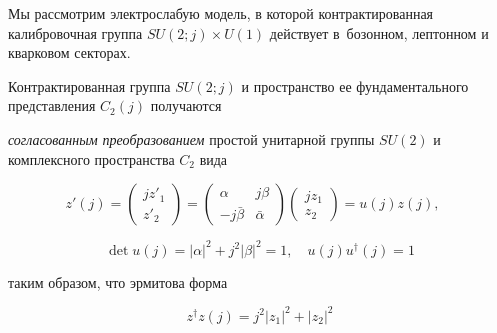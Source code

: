 
Мы рассмотрим электрослабую модель, в которой контрактированная калибровочная группа \mbox{$S\!U\!(\!2;\!j\!){\times} U\!(\!1\!)$} действует в~бозонном, лептонном и кварковом секторах. 

Контрактированная группа $SU(2;j)$ и пространство ее фундаментального представления $C_2(j)$ получаются 

\cite{gromov:Gr-2010, gromov:Gr-2011}

{\em согласованным преобразованием} простой унитарной группы $SU(2)$ и комплексного пространства $C_2$ вида

$$

z'(j)=

\left(\begin{array}{c}

jz'_1 \\

z'_2

\end{array} \right)

=\left(\begin{array}{cc}

	\alpha & j\beta   \\

-j\bar{\beta}	 & \bar{\alpha}

\end{array} \right)

\left(\begin{array}{c}

jz_1 \\

z_2

\end{array} \right)

=u(j)z(j), \quad

$$

\begin{equation}

\det u(j)=|\alpha|^2+j^2|\beta|^2=1, \quad u(j)u^{\dagger}(j)=1

\label{gr:eq:eq5-21}

\end{equation}

таким образом, что эрмитова форма 

\begin{equation}

z^\dagger z(j)=j^2|z_1|^2+|z_2|^2

\label{gr:eq:eq5-31}

\end{equation}

